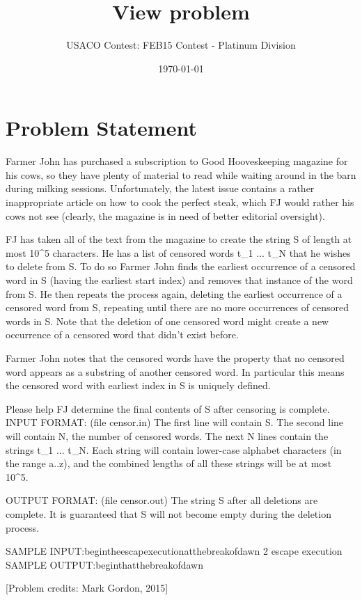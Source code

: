 \documentclass[12pt]{article}
\title{View problem}
\author{USACO Contest: FEB15 Contest - Platinum Division}
\date{\today}
\begin{document}
\maketitle

\section*{Problem Statement}

Farmer John has purchased a subscription to Good Hooveskeeping magazine for his cows, so they have plenty of material to read while waiting around in the barn during milking sessions.  Unfortunately, the latest issue contains a rather inappropriate article on how to cook the perfect steak, which FJ would rather his cows not see (clearly, the magazine is in need of better editorial oversight).

FJ has taken all of the text from the magazine to create the string S of length at most 10^5 characters.  He has a list of censored words t_1 ... t_N that he wishes to delete from S.  To do so Farmer John finds the earliest occurrence of a censored word in S (having the earliest start index) and removes that instance of the word from S.  He then repeats the process again, deleting the earliest occurrence of a censored word from S, repeating until there are no more occurrences of censored words in S.  Note that the deletion of one censored word might create a new occurrence of a censored word that didn't exist before.

Farmer John notes that the censored words have the property that no censored word appears as a substring of another censored word.  In particular this means the censored word with earliest index in S is uniquely defined.

Please help FJ determine the final contents of S after censoring is complete.
INPUT FORMAT: (file censor.in)
The first line will contain S.  
The second line will contain N, the number of censored words.  
The next N lines contain the strings t_1 ... t_N.  Each string will contain lower-case alphabet characters (in the range a..z), and the combined lengths of all these strings will be at most 10^5.

OUTPUT FORMAT: (file censor.out)
The string S after all deletions are complete.  It is guaranteed that S will not become empty during the deletion process.

SAMPLE INPUT:begintheescapexecutionatthebreakofdawn
2
escape
execution
SAMPLE OUTPUT:beginthatthebreakofdawn


[Problem credits: Mark Gordon, 2015]
\end{document}
